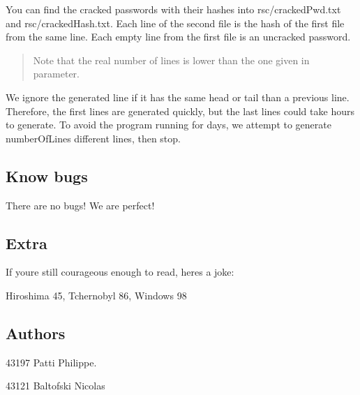 You can find the cracked passwords with their hashes into {\ttfamily rsc/cracked\+Pwd.\+txt} and {\ttfamily rsc/cracked\+Hash.\+txt}. Each line of the second file is the hash of the first file from the same line. Each empty line from the first file is an uncracked password.

\begin{quote}
Note that the real number of lines is lower than the one given in parameter. \end{quote}
We ignore the generated line if it has the same head or tail than a previous line. Therefore, the first lines are generated quickly, but the last lines could take hours to generate. To avoid the program running for days, we attempt to generate number\+Of\+Lines different lines, then stop.

\subsection*{Know bugs}

There are no bugs! We are perfect!

\subsection*{Extra}

If you\textquotesingle{}re still courageous enough to read, here\textquotesingle{}s a joke\+:

Hiroshima 45, Tchernobyl 86, Windows 98

\subsection*{Authors}

43197 Patti Philippe.

43121 Baltofski Nicolas 
